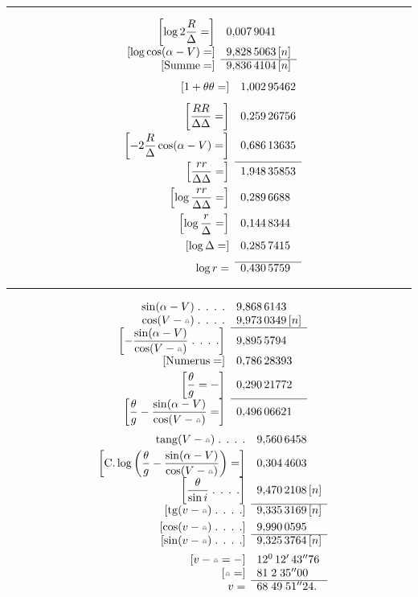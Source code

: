 \noindent\rule{\linewidth}{.3pt}
\[
\begin{array}{rl}
{}\left[\log2\dfrac R\Delta=\right]&0{,}007\,9041\\[3pt]
{}[\log\cos(\alpha-V)=]&9{,}828\,5063\,[n]\\\cline{2-2}
{}[\text{Summe}=]&9{,}836\,4104\,[n]
\end{array}
\]
\[
\begin{array}{rl}
{}[1+\theta\theta=]&1{,}002\,95462\\[8pt]
{}\left[\dfrac{RR}{\Delta\Delta}=\right]&0{,}259\,26756\\[8pt]
{}\left[-2\dfrac R\Delta\cos(\alpha-V)=\right]&0{,}686\,13635\\[8pt]\cline{2-2}
{}\left[\dfrac{rr}{\Delta\Delta}=\right]&1{,}948\,35853\\[8pt]
{}\left[\log\dfrac{rr}{\Delta\Delta}=\right]&0{,}289\,6688\\[8pt]
{}\left[\log\dfrac r\Delta=\right]&0{,}144\,8344\\[8pt]
{}[\log\Delta=]&0{,}285\,7415\\[8pt]\cline{2-2}
\log r=&0{,}430\,5759
\end{array}
\]
\noindent\rule{\linewidth}{.3pt}
\[
\begin{array}{rl}
\sin(\alpha-V)\;\text{. . . .}&9{,}868\,6143\\
\cos(V-\AstNode)\;\text{. . . .}&9{,}973\,0349\,[n]\\\cline{2-2}
{}\left[-\dfrac{\sin(\alpha-V)}{\cos(V-\AstNode)}\;\text{. . . .}\right]&9{,}895\,5794\\[3pt]
{}[\text{Numerus}=]&0{,}786\,28393\\[3pt]
{}\left[\dfrac\theta g=-\right]&0{,}290\,21772\\\cline{2-2}
{}\left[\dfrac\theta g-\dfrac{\sin(\alpha-V)}{\cos(V-\AstNode)}=\right]&0{,}496\,06621
\end{array}
\]
\[
\begin{array}{rl}
\operatorname{tang}(V-\AstNode)\;\text{. . . .}&9{,}560\,6458\\[3pt]
{}\left[\mathrm{C.}\log\left(\dfrac\theta g-\dfrac{\sin(\alpha-V)}{\cos(V-\AstNode)}\right)=\right]&0{,}304\,4603\\[3pt]
{}\left[\dfrac\theta{\sin i}\;\text{. . . .}\right]&9{,}470\,2108\,[n]\\\cline{2-2}
{}[\operatorname{tg}(v-\AstNode)\;\text{. . . .}]&9{,}335\,3169\,[n]\\[3pt]
{}[\cos(v-\AstNode)\;\text{. . . .}]&9{,}990\,0595\\\cline{2-2}
{}[\sin(v-\AstNode)\;\text{. . . .}]&9{,}325\,3764\,[n]\\[5pt]
{}[v-\AstNode=-]&12^0\,12'\,43''76\\
{}[\AstNode=]&81\;2\;35''00\\\cline{2-2}
v=&68\;49\;51''24.
\end{array}
\]

